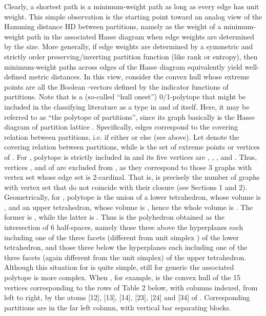 \documentclass[a4paper,10pt]{article}
\begin{document}
Clearly, a shortest path is a minimum-weight path as long as every edge has unit weight. This simple observation is the starting point toward an analog view of the Hamming
distance HD between partitions, namely as the weight of a minimum-weight path in the associated Hasse diagram when edge weights are determined by the size. More generally, if edge
weights are determined by a symmetric and strictly order preserving/inverting partition function (like rank or entropy), then minimum-weight paths across edges of the
Hasse diagram equivalently yield well-defined metric distances.
In this view, consider the convex hull  whose extreme points
\cite{BronstedConvex,Branko2001} are all the  Boolean -vectors defined by the indicator functions  of partitions. Note that
 is a (so-called ``hull onest'') 0/1-polytope that might be included in the classifying literature \cite{Aicholzer+96,Ziegler2000} as a type in and of itself. Here, it may be
referred to as ``the polytope of partitions'', since its graph  basically is the Hasse diagram of partition lattice .
Specifically, edges correspond to the covering relation between partitions, i.e.  if either  or else  (see above). Let
 denote the covering relation between partitions, while  is the set of extreme points or
vertices of . For , polytope  is strictly included in  and its five vertices are , , ,  and
. Thus, vertices ,  and  of  are excluded from , as they correspond to those 3 graphs with vertex set
 whose edge set is 2-cardinal. That is,  is precisely the number of graphs with vertex set  that do not coincide with their closure
(see Sections 1 and 2). Geometrically, for , polytope  is the union of a lower tetrahedron, whose volume is , and an upper tetrahedron,
whose volume is , hence the whole volume is . The former is , while the latter is .
Thus  is the polyhedron obtained as the intersection of 6 half-spaces, namely those three above the hyperplanes each including one of the three facets (different from
unit simplex ) of the lower tetrahedron, and those three below the hyperplanes each including one of the three facets (again different from the unit
simplex) of the upper tetrahedron.
Although this situation for  is quite simple, still for generic  the associated polytope  is more complex. When , for example,
 is the convex hull of the 15 vertices corresponding to the rows of Table 2 below, with columns indexed, from left to right, by the  atoms
[12], [13], [14], [23], [24] and [34] of . Corresponding partitions are in the far left column, with vertical bar  separating blocks.
\end{document}
